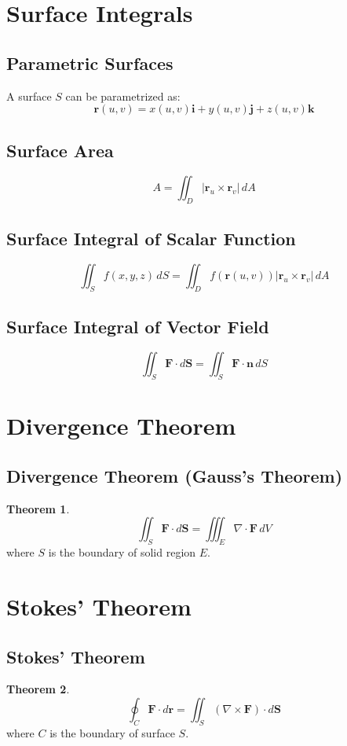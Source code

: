 \documentclass[11pt]{article}
\theoremstyle{definition}
\newtheorem{theorem}{Theorem}[section]
\begin{document}
\section{Surface Integrals}

\subsection{Parametric Surfaces}
A surface $S$ can be parametrized as:
$$\mathbf{r}(u,v) = x(u,v)\mathbf{i} + y(u,v)\mathbf{j} + z(u,v)\mathbf{k}$$

\subsection{Surface Area}
$$A = \iint_D |\mathbf{r}_u \times \mathbf{r}_v| \, dA$$

\subsection{Surface Integral of Scalar Function}
$$\iint_S f(x,y,z) \, dS = \iint_D f(\mathbf{r}(u,v)) |\mathbf{r}_u \times \mathbf{r}_v| \, dA$$

\subsection{Surface Integral of Vector Field}
$$\iint_S \mathbf{F} \cdot d\mathbf{S} = \iint_S \mathbf{F} \cdot \mathbf{n} \, dS$$

\section{Divergence Theorem}

\subsection{Divergence Theorem (Gauss's Theorem)}
\begin{theorem}
$$\iint_S \mathbf{F} \cdot d\mathbf{S} = \iiint_E \nabla \cdot \mathbf{F} \, dV$$
where $S$ is the boundary of solid region $E$.
\end{theorem}

\section{Stokes' Theorem}

\subsection{Stokes' Theorem}
\begin{theorem}
$$\oint_C \mathbf{F} \cdot d\mathbf{r} = \iint_S (\nabla \times \mathbf{F}) \cdot d\mathbf{S}$$
where $C$ is the boundary of surface $S$.
\end{theorem}
\end{document}
